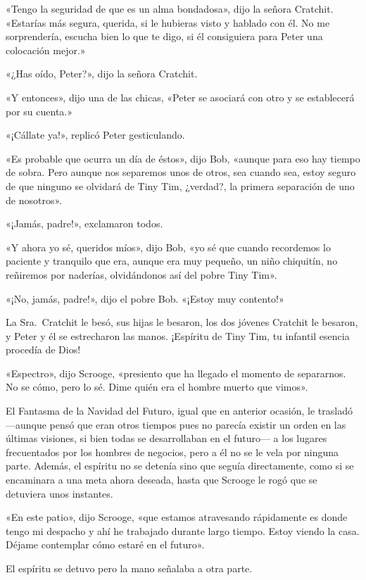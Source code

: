 \documentclass{novela}
\begin{document}
 «Tengo la seguridad de que es un alma bondadosa», dijo la señora Cratchit. «Estarías más segura, querida, si le hubieras visto y hablado con él. No me sorprendería, escucha bien lo que te digo, si él consiguiera para Peter una colocación mejor.»

 «¿Has oído, Peter?», dijo la señora Cratchit.

 «Y entonces», dijo una de las chicas, «Peter se asociará con otro y se establecerá por su cuenta.»

 «¡Cállate ya!», replicó Peter gesticulando.

 «Es probable que ocurra un día de éstos», dijo Bob, «aunque para eso hay tiempo de sobra. Pero aunque nos separemos unos de otros, sea cuando sea, estoy seguro de que ninguno se olvidará de Tiny Tim, ¿verdad?, la primera separación de uno de nosotros».

 «¡Jamás, padre!», exclamaron todos.

 «Y ahora yo sé, queridos míos», dijo Bob, «yo sé que cuando recordemos lo paciente y tranquilo que era, aunque era muy pequeño, un niño chiquitín, no reñiremos por naderías, olvidándonos así del pobre Tiny Tim».

 «¡No, jamás, padre!», dijo el pobre Bob. «¡Estoy muy contento!»

 La Sra.~Cratchit le besó, sus hijas le besaron, los dos jóvenes Cratchit le besaron, y Peter y él se estrecharon las manos. ¡Espíritu de Tiny Tim, tu infantil esencia procedía de Dios!

 «Espectro», dijo Scrooge, «presiento que ha llegado el momento de separarnos. No se cómo, pero lo sé. Dime quién era el hombre muerto que vimos».

 El Fantasma de la Navidad del Futuro, igual que en anterior ocasión, le trasladó ---aunque pensó que eran otros tiempos pues no parecía existir un orden en las últimas visiones, si bien todas se desarrollaban en el futuro--- a los lugares frecuentados por los hombres de negocios, pero a él no se le vela por ninguna parte. Además, el espíritu no se detenía sino que seguía directamente, como si se encaminara a una meta ahora deseada, hasta que Scrooge le rogó que se detuviera unos instantes.

 «En este patio», dijo Scrooge, «que estamos atravesando rápidamente es donde tengo mi despacho y ahí he trabajado durante largo tiempo. Estoy viendo la casa. Déjame contemplar cómo estaré en el futuro».

 El espíritu se detuvo pero la mano señalaba a otra parte.
\end{document}
